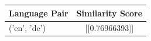 \begin{tabular}{|l|c|}
\hline
Language Pair & Similarity Score \\
\hline
('en', 'de') & [[0.76966393]] \\
\hline
\end{tabular}

